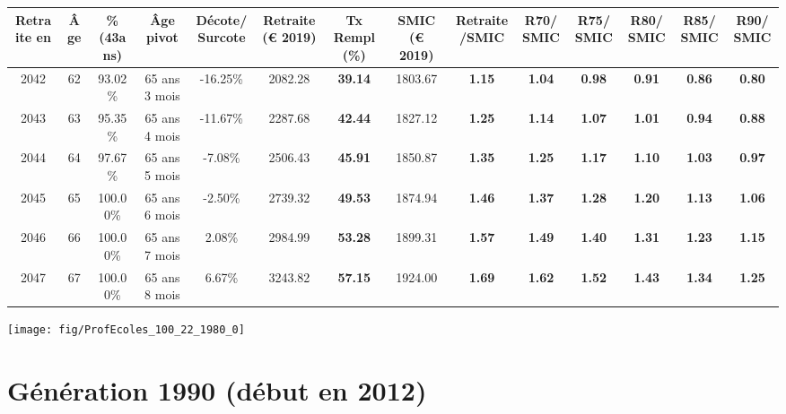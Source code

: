 \begin{adjustbox}{max width=\textwidth} 
\begin{tabular}[htb]{|c|c||c|c|c||c|c||c|c||c|c|c|c|c|} 
\hline 
 Retraite en &  Âge &  \%(43ans) &  Âge pivot &  Décote/Surcote &  Retraite (\euro{} 2019) &  Tx Rempl(\%) &  SMIC (\euro{} 2019) &  Retraite/SMIC &  R70/SMIC &  R75/SMIC &  R80/SMIC &  R85/SMIC &  R90/SMIC \\ 
\hline \hline 
 2042 &  62 &  93.02\% &  65 ans 3 mois &  -16.25\% &  2082.28 &  {\bf 39.14} &  1803.67 &  {\bf 1.15} &  {\bf 1.04} &  {\bf {\color{red} 0.98}} &  {\bf {\color{red} 0.91}} &  {\bf {\color{red} 0.86}} &  {\bf {\color{red} 0.80}} \\ 
\hline 
 2043 &  63 &  95.35\% &  65 ans 4 mois &  -11.67\% &  2287.68 &  {\bf 42.44} &  1827.12 &  {\bf 1.25} &  {\bf 1.14} &  {\bf 1.07} &  {\bf 1.01} &  {\bf {\color{red} 0.94}} &  {\bf {\color{red} 0.88}} \\ 
\hline 
 2044 &  64 &  97.67\% &  65 ans 5 mois &  -7.08\% &  2506.43 &  {\bf 45.91} &  1850.87 &  {\bf 1.35} &  {\bf 1.25} &  {\bf 1.17} &  {\bf 1.10} &  {\bf 1.03} &  {\bf {\color{red} 0.97}} \\ 
\hline 
 2045 &  65 &  100.00\% &  65 ans 6 mois &  -2.50\% &  2739.32 &  {\bf 49.53} &  1874.94 &  {\bf 1.46} &  {\bf 1.37} &  {\bf 1.28} &  {\bf 1.20} &  {\bf 1.13} &  {\bf 1.06} \\ 
\hline 
 2046 &  66 &  100.00\% &  65 ans 7 mois &  2.08\% &  2984.99 &  {\bf 53.28} &  1899.31 &  {\bf 1.57} &  {\bf 1.49} &  {\bf 1.40} &  {\bf 1.31} &  {\bf 1.23} &  {\bf 1.15} \\ 
\hline 
 2047 &  67 &  100.00\% &  65 ans 8 mois &  6.67\% &  3243.82 &  {\bf 57.15} &  1924.00 &  {\bf 1.69} &  {\bf 1.62} &  {\bf 1.52} &  {\bf 1.43} &  {\bf 1.34} &  {\bf 1.25} \\ 
\hline 
\hline 
\end{tabular} 
\end{adjustbox} 
 
 \vspace{0.1cm} 

 {\hspace{-2.2cm}\texttt{[image: fig/ProfEcoles\_100\_22\_1980\_0]}} 

\newpage 
 
\section{Génération 1990 (début en 2012)\label{ProfEcoles_100_22_1990_0}} 
 
